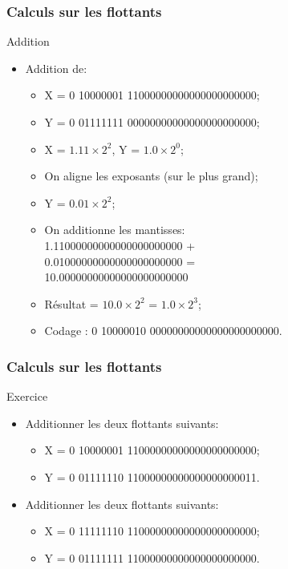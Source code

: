 \documentclass{beamer}
\begin{document}
\begin{frame}
\frametitle{Calculs sur les flottants}

\begin{block}{Addition}
\begin{itemize}
\item Addition de:
\begin{itemize}
\item X = 0 10000001 11000000000000000000000;
\item Y = 0 01111111 00000000000000000000000;
\item X = $1.11\times{}2^2$, Y = $1.0\times{}2^0$;
\item On aligne les exposants (sur le plus grand);
\item Y = $0.01\times{}2^2$;
\item On additionne les mantisses:\\
1.11000000000000000000000 +\\
0.01000000000000000000000 =\\
10.00000000000000000000000
\item Résultat = $10.0\times{}2^2$ = $1.0\times{}2^3$;
\item Codage : 0 10000010 00000000000000000000000.
\end{itemize}
\end{itemize}
\end{block}
\end{frame}

\begin{frame}
\frametitle{Calculs sur les flottants}

\begin{block}{Exercice}
\begin{itemize}
\item Additionner les deux flottants suivants:
\begin{itemize}
\item X = 0 10000001 11000000000000000000000;
\item Y = 0 01111110 11000000000000000000011.
\end{itemize}

\item Additionner les deux flottants suivants:
\begin{itemize}
\item X = 0 11111110 11000000000000000000000;
\item Y = 0 01111111 11000000000000000000000.
\end{itemize}
\end{itemize}
\end{block}
\end{frame}
\end{document}
